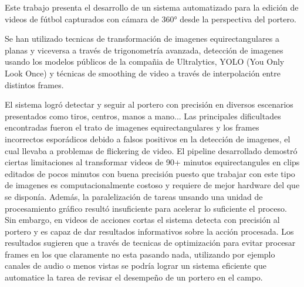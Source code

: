 Este trabajo presenta el desarrollo de un sistema automatizado para la edición de videos de fútbol capturados con cámara de 360° desde la perspectiva del portero.

Se han utilizado tecnicas de transformación de imagenes equirectangulares a planas y viceversa a través de trigonometría avanzada, detección de imagenes usando los modelos públicos de la compañia de Ultralytics, YOLO (You Only Look Once) y técnicas de smoothing de video a través de interpolación entre distintos frames.


El sistema logró detectar y seguir al portero con precisión en diversos escenarios presentados como tiros, centros, manos a mano... Las principales dificultades encontradas fueron el trato de imagenes equirectangulares y los frames incorrectos esporádicos debido a falsos positivos en la detección de imagenes, el cual llevaba a problemas de flickering de video. El pipeline desarrollado demostró ciertas limitaciones al transformar videos de 90+ minutos equirectangules en clips editados de pocos minutos con buena precisión puesto que trabajar con este tipo de imagenes es computacionalmente costoso y requiere de mejor hardware del que se disponía. Además, la paralelización de tareas unsando una unidad de procesamiento gráfico resultó insuficiente para acelerar lo suficiente el proceso. Sin embargo, en videos de acciones cortas el sistema detecta con precisión al portero y es capaz de dar resultados informativos sobre la acción procesada. Los resultados sugieren que a través de tecnicas de optimización para evitar procesar frames en los que claramente no esta pasando nada, utilizando por ejemplo canales de audio o menos vistas se podría lograr un sistema eficiente que automatice la tarea de revisar el desempeño de un portero en el campo.

